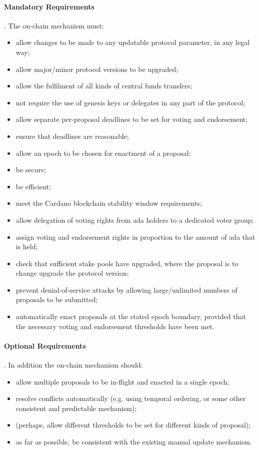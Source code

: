 \paragraph{Mandatory Requirements}.  The on-chain mechanism must:

\begin{itemize}
\item
  allow changes to be made to any updatable protocol parameter, in any legal way;
\item
  allow major/minor protocol versions to be upgraded;
\item
  allow the fulfilment of all kinds of central funds transfers;
\item
  not require the use of genesis keys or delegates in any part of the protocol;
\item
  allow separate per-proposal deadlines to be set for voting and endorsement;
\item
  ensure that deadlines are reasonable;
\item
  allow an epoch to be chosen for enactment of a proposal;
\item
  be secure;
\item
  be efficient;
\item
  meet the Cardano blockchain stability window requirements;
\item
  allow delegation of voting rights from ada holders to a dedicated voter group;
\item
  assign voting and endorsement rights in proportion to the amount of ada that is held;
\item
  check that sufficient stake pools have upgraded, where the proposal is to change upgrade the protocol version;
\item
  prevent denial-of-service attacks by allowing large/unlimited numbers of proposals to be submitted;
\item
  automatically enact proposals at the stated epoch boundary, provided that the necessary voting and endorsement thresholds have been met.
\end{itemize}

\paragraph{Optional Requirements}.  In addition the on-chain mechanism should:

\begin{itemize}
\item
  allow multiple proposals to be in-flight and enacted in a single epoch;
\item
  resolve conflicts automatically (e.g. using temporal ordering, or some other consistent and predictable mechanism);
\item
  (perhaps, allow different thresholds to be set for different kinds of proposal);
\item
  as far as possible, be consistent with the existing manual update mechanism.
\end{itemize}
